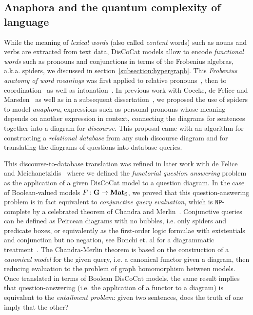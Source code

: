 
\subsection{Anaphora and the quantum complexity of language}\label{section:anaphora}

While the meaning of \emph{lexical words} (also called \emph{content} words) such as nouns and verbs are extracted from text data, DisCoCat models allow to encode \emph{functional words} such as pronouns and conjunctions in terms of the Frobenius algebras, a.k.a. spiders, we discussed in section~\ref{subsection:hypergraph}.
This \emph{Frobenius anatomy of word meanings} was first applied to relative pronouns~\cite{SadrzadehEtAl13,SadrzadehEtAl14}, then to coordination~\cite{Kartsaklis16} as well as intonation~\cite{KartsaklisSadrzadeh15}.
In previous work with Coecke, de Felice and Marsden~\cite{CoeckeEtAl18a} as well as in a subsequent dissertation~\cite{Toumi18a}, we proposed the use of spiders to model \emph{anaphora}, expressions such as personal pronouns whose meaning depends on another expression in context, connecting the diagrams for sentences together into a diagram for \emph{discourse}.
This proposal came with an algorithm for constructing a \emph{relational database} from any such discourse diagram and for translating the diagrams of questions into database queries.

This discourse-to-database translation was refined in later work with de Felice and Meichanetzidis~\cite{FeliceEtAl19} where we defined the \emph{functorial question answering} problem as the application of a given DisCoCat model to a question diagram.
In the case of Boolean-valued models $F : \mathbf{G} \to \mathbf{Mat}_{\mathbb{S}}$, we proved that this question-answering problem is in fact equivalent to \emph{conjunctive query evaluation}, which is $\mathtt{NP}$-complete by a celebrated theorem of Chandra and Merlin~\cite{ChandraMerlin77}.
Conjunctive queries can be defined as Peircean diagrams with no bubbles, i.e. only spiders and predicate boxes, or equivalently as the first-order logic formulae with existentials and conjunction but no negation, see Bonchi et. al for a diagrammatic treatment~\cite{BonchiEtAl18}.
The Chandra-Merlin theorem is based on the construction of a \emph{canonical model} for the given query, i.e. a canonical functor given a diagram, then reducing evaluation to the problem of graph homomorphism between models.
Once translated in terms of Boolean DisCoCat models, the same result implies that question-answering (i.e. the application of a functor to a diagram) is equivalent to the \emph{entailment problem}: given two sentences, does the truth of one imply that the other?


